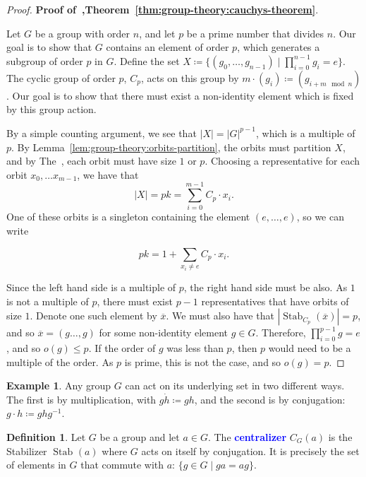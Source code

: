 \documentclass[12pt]{report}
\newcommand{\indx}[1]{\index{#1}\textbf{\textcolor{blue}{#1}}}
\newcommand{\Stab}{\operatorname{Stab}}
\theoremstyle{definition}
\newtheorem{definition}[theorem]{Definition}
\newtheorem{example}[theorem]{Example}
\begin{document}
\begin{proof}
  \textbf{Proof of~,Theorem~\ref{thm:group-theory:cauchys-theorem}}.

  Let \(G\) be a group with order \(n\), and let \(p\) be a prime number that divides \(n\). Our goal is to show that \(G\) contains an element of order \(p\), which generates a subgroup of order \(p\) in \(G\). Define the set \(X \coloneqq \{(g_{0}, \ldots, g_{n-1}) \mid \prod_{i=0}^{n-1}g_{i} = e\}\). The cyclic group of order \(p\), \(C_{p}\), acts on this group by \(m \cdot (g_{i}) \coloneqq (g_{i + m \mod n})\). Our goal is to show that there must exist a non-identity element which is fixed by this group action.

  By a simple counting argument, we see that \(|X| = |G|^{p-1}\), which is a multiple of \(p\). By Lemma~\ref{lem:group-theory:orbits-partition}, the orbits must partition \(X\), and by The~, each orbit must have size \(1\) or \(p\). Choosing a representative for each orbit \(x_{0}, \ldots x_{m-1}\), we have that
  \[|X| = pk = \sum_{i=0}^{m-1} C_{p} \cdot x_{i}.\]
  One of these orbits is a singleton containing the element \((e, \ldots, e)\), so we can write

  \[pk = 1 + \sum_{x_{i} \neq e} C_{p} \cdot x_{i}.\]

  Since the left hand side is a multiple of \(p\), the right hand side must be also. As \(1\) is not a multiple of \(p\), there must exist \(p-1\) representatives that have orbits of size \(1\). Denote one such element by \(\overline x\). We must also have that \(|\Stab_{C_{p}}(\overline x)| = p\), and so \(\overline x = (g \ldots, g)\) for some non-identity element \(g \in G\). Therefore, \(\prod_{i=0}^{p-1}g = e\), and so \(o(g) \leq p\). If the order of \(g\) was less than \(p\), then \(p\) would need to be a multiple of the order. As \(p\) is prime, this is not the case, and so \(o(g) = p\).
\end{proof}

\begin{example}
  Any group \(G\) can act on its underlying set in two different ways. The first is by multiplication, with \(g \dot h \coloneqq gh\), and the second is by conjugation: \(g \cdot h \coloneqq ghg^{-1}\).
\end{example}

\begin{definition}\label{def:group-theory:centralizer}
  Let \(G\) be a group and let \(a \in G\). The \indx{centralizer} \(C_{G}(a)\) is the Stabilizer \(\Stab_{}(a)\) where \(G\) acts on itself by conjugation. It is precisely the set of elements in \(G\) that commute with \(a\): \(\{g \in G \mid ga = ag\}\).
\end{definition}
\end{document}
